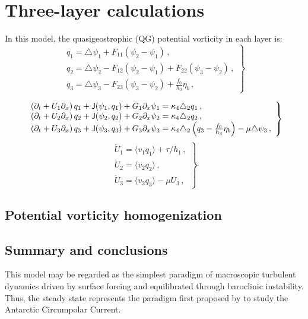 \documentclass{jfm}
\newcommand{\com}{\, ,}
\newcommand{\lap}{\triangle}
\newcommand{\ssd}{\kappa_4 \triangle_2}
\newcommand{\jacob}[2]{\mathsf{J}(#1,#2)}
\newcommand{\la}{\langle}
\newcommand{\ra}{\rangle}
\begin{document}
\section{Three-layer calculations}\label{sec:two_layer}

In this model, the quasigeostrophic (QG) potential vorticity
in each layer is:
\begin{equation}
\left. \begin{array}{l}
\displaystyle
   \label{pv3}
   {q_1} = \lap\psi_1 + F_{11} \left(\psi_{2}-\psi_1\right)\com \\
   {q_2} = \lap\psi_2 - F_{12} \left(\psi_{2}-\psi_1\right) +
              F_{22}\left(\psi_{3}-\psi_2\right) \com \\
              {q_3} = \lap\psi_3 - F_{23}\left(\psi_{3}-\psi_2\right) +
              \frac{f_0}{h_3}\eta_b \com
\end{array} \right\}
\end{equation}

\begin{equation}
\left. \begin{array}{l}
\displaystyle
   \label{pvevolution3}
\left(\p_t + U_1 \p_x\right) q_1  + \jacob{\psi_1}{q_1} + G_1 \p_x \psi_1
= \ssd q_1 \com \\
\left(\p_t + U_2 \p_x\right) q_2  + \jacob{\psi_2}{q_2}+ G_2 \p_x \psi_2
= \ssd q_2 \com \\
\left(\p_t + U_3 \p_x\right) q_3  + \jacob{\psi_3}{q_3} + G_3 \p_x \psi_3
= \ssd \left(q_3-\frac{f_0}{h_3}\eta_b\right) -\mu \lap \psi_3 \com
\end{array} \right\}
\end{equation}
\begin{equation}
\left. \begin{array}{l}
\displaystyle
   \label{slowUevolution3}
    \dot U_1  = \la v_1 q_1 \ra + \tau/h_1 \com    \\
    \dot U_2  = \la v_2 q_2 \ra   \com  \\
    \dot U_3  = \la v_3 q_3 \ra - \mu U_3  \com
  \end{array} \right\}
\end{equation}

\subsection{Potential vorticity homogenization}


\subsection{Summary and conclusions}
This model may be regarded as the simplest paradigm  of macroscopic turbulent
dynamics driven by surface forcing and equilibrated through baroclinic instability.
Thus, the steady state represents the paradigm first proposed by
\citep{johnson_bryden1989} to study the Antarctic Circumpolar Current.
\end{document}
